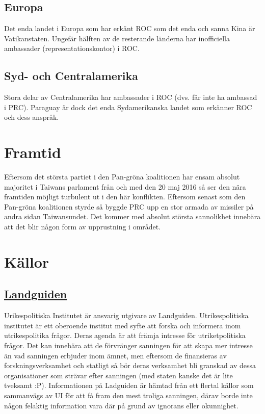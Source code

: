 \documentclass[a4paper,10pt]{article}
\begin{document}
\subsection*{Europa}
Det enda landet i Europa som har erkänt ROC som det enda och sanna Kina är Vatikanstaten. Ungefär hälften av de resterande länderna har inofficiella ambassader (representationskontor) i ROC.

\subsection*{Syd- och Centralamerika}
Stora delar av Centralamerika har ambassader i ROC (dvs. får inte ha ambassad i PRC). Paraguay är dock det enda Sydamerikanska landet som erkänner ROC och dess anspråk.

\section*{Framtid}
Eftersom det största partiet i den Pan-gröna koalitionen har ensam absolut majoritet i Taiwans parlament från och med den 20 maj 2016 så ser den nära framtiden möjligt turbulent ut i den här konflikten. Eftersom senast som den Pan-gröna koalitionen styrde så byggde PRC upp en stor armada av missiler på andra sidan Taiwansundet. Det kommer med absolut största sannolikhet innebära att det blir någon form av upprustning i området. 

\section*{Källor}
\subsection*{\href{https://www.landguiden.se/Lander/Asien/Taiwan}{Landguiden}}
Urikespolitiska Institutet är ansvarig utgivare av Landguiden. Utrikespolitiska institutet är ett oberoende institut med syfte att forska och informera inom utrikespolitika frågor. Deras agenda är att främja intresse för utriketpolitiska frågor. Det kan innebära att de förvränger sanningen för att skapa mer intresse än vad sanningen erbjuder inom ämnet, men eftersom de finansieras av forskningsverksamhet och statligt så bör deras verksamhet bli granskad av dessa organisationer som strävar efter sanningen (med staten kanske det är lite tveksamt :P). Informationen på Ladguiden är hämtad från ett flertal källor som sammanvägs av UI för att få fram den mest troliga sanningen, därav borde inte någon felaktig information vara där på grund av ignorans eller okunnighet. 
\end{document}
